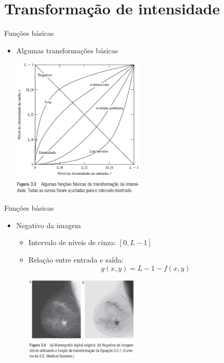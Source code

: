    \section[ slide = true ]{Transformação de intensidade}
      \begin{slide}[toc=]{Funções básicas}
         \begin{itemize}[type=1]
          \item Algumas transformações básicas
          \begin{center}
                  \includegraphics[width=0.5\textwidth]{figs/fig0303}
               \end{center}
         \end{itemize}
      \end{slide}

       
      \begin{slide}[toc=]{Funções básicas}
         \begin{itemize}[type=1]
            \item Negativo da imagem
            \begin{itemize}
               \item Intervalo de níveis de cinza: $[0,L-1]$
               \item Relação entre entrada e saída: \begin{equation*}g(x,y) = L-1 - f(x,y)\end{equation*}
               \begin{center}
                  \includegraphics[width=0.45\textwidth]{figs/fig0304}
               \end{center}
            \end{itemize}
         \end{itemize}
         
      \end{slide}
            

